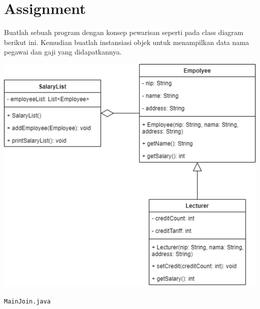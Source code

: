 \documentclass[12pt,titlepage]{article}
\begin{document}
\section{Assignment}
\noindent
Buatlah sebuah program dengan konsep pewarisan seperti pada class diagram berikut ini. Kemudian buatlah instansiasi objek untuk menampilkan data nama pegawai dan gaji yang didapatkannya.
\begin{center}
    \includegraphics[width=.75\textwidth]{images/figures/fig1.drawio.png}
\end{center}
\texttt{MainJoin.java}
\end{document}
